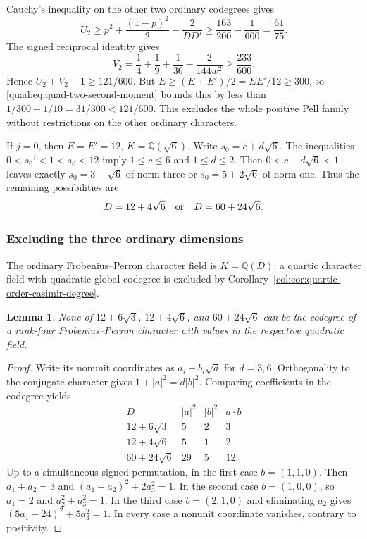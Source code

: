 \documentclass[11pt,a4paper]{article}
\newtheorem{lemma}[theorem]{Lemma}
\theoremstyle{definition}\newtheorem{definition}[theorem]{Definition}
\theoremstyle{remark}\newtheorem{remark}[theorem]{Remark}
\newcommand{\Q}{\mathbb Q}
\numberwithin{equation}{section}
\begin{document}
Cauchy's inequality on the other two ordinary codegrees gives
\[
 U_2\ge p^2+\frac{(1-p)^2}{2}-\frac2{DD'}
       \ge\frac{163}{200}-\frac1{600}=\frac{61}{75}.
\]
The signed reciprocal identity gives
\[
 V_2=\frac14+\frac19+\frac1{36}-\frac2{144w^2}
       \ge\frac{233}{600}.
\]
Hence $U_2+V_2-1\ge121/600$.
But $E\ge(E+E')/2=EE'/12\ge300$, so
\eqref{quad:eq:quad-two-second-moment} bounds this by less than
$1/300+1/10=31/300<121/600$. This excludes the whole positive
Pell family without restrictions on the other ordinary characters.

If $j=0$, then $E=E'=12$, $K=\Q(\sqrt6)$.
Write $s_0=c+d\sqrt6$. The inequalities
$0<s_0'<1<s_0<12$ imply $1\le c\le6$ and $1\le d\le2$.
Then $0<c-d\sqrt6<1$ leaves exactly
$s_0=3+\sqrt6$ of norm three or $s_0=5+2\sqrt6$ of norm one.
Thus the remaining possibilities are
\begin{equation}\label{quad:eq:quad-two-residual-six}
 D=12+4\sqrt6\quad\hbox{or}\quad D=60+24\sqrt6.
\end{equation}

\subsubsection{Excluding the three ordinary dimensions}

The ordinary Frobenius--Perron character field is $K=\Q(D)$:
a quartic character field with quadratic global codegree is excluded
by Corollary~\ref{col:cor:quartic-order-casimir-degree}.

\begin{lemma}\label{quad:lem:three-ordinary-rows}
None of $12+6\sqrt3$, $12+4\sqrt6$, and $60+24\sqrt6$ can be the
codegree of a rank-four Frobenius--Perron character with values in
the respective quadratic field.
\end{lemma}
\begin{proof}
Write its nonunit coordinates as $a_i+b_i\sqrt d$ for $d=3,6$.
Orthogonality to the conjugate character gives $1+|a|^2=d|b|^2$.
Comparing coefficients in the codegree yields
\[
\begin{array}{c|ccc}
D&|a|^2&|b|^2&a\cdot b\\\hline
12+6\sqrt3&5&2&3\\
12+4\sqrt6&5&1&2\\
60+24\sqrt6&29&5&12 .
\end{array}
\]
Up to a simultaneous signed permutation, in the first case $b=(1,1,0)$.
Then $a_1+a_2=3$ and $(a_1-a_2)^2+2a_3^2=1$. In the second case
$b=(1,0,0)$, so $a_1=2$ and $a_2^2+a_3^2=1$. In the third case
$b=(2,1,0)$ and eliminating $a_2$ gives $(5a_1-24)^2+5a_3^2=1$.
In every case a nonunit coordinate vanishes, contrary to positivity.
\end{proof}
\end{document}

